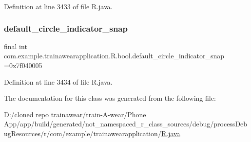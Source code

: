 Definition at line 3433 of file R.\+java.

\mbox{\label{classcom_1_1example_1_1trainawearapplication_1_1_r_1_1bool_a9b060d1e8dac047d3a6e659b17039612}} 
\subsubsection{\texorpdfstring{default\_circle\_indicator\_snap}{default\_circle\_indicator\_snap}}
{\footnotesize\ttfamily final int com.\+example.\+trainawearapplication.\+R.\+bool.\+default\+\_\+circle\+\_\+indicator\+\_\+snap =0x7f040005\hspace{0.3cm}{\ttfamily [static]}}



Definition at line 3434 of file R.\+java.



The documentation for this class was generated from the following file\+:\begin{DoxyCompactItemize}
\item 
D\+:/cloned repo trainawear/train-\/\+A-\/wear/\+Phone App/app/build/generated/not\+\_\+namespaced\+\_\+r\+\_\+class\+\_\+sources/debug/process\+Debug\+Resources/r/com/example/trainawearapplication/\mbox{\hyperlink{process_debug_resources_2r_2com_2example_2trainawearapplication_2_r_8java}{R.\+java}}\end{DoxyCompactItemize}
